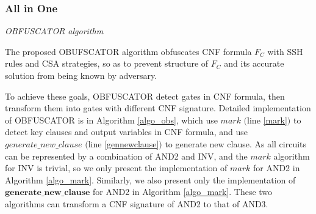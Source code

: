 \documentclass[conference,compsocconf]{IEEEtran}
\begin{document}
\subsubsection{All in One}\textsl{OBFUSCATOR algorithm}

The proposed OBUFSCATOR algorithm obfuscates CNF formula $F_C$ with SSH rules and CSA strategies, 
so as to prevent structure of $F_C$ and its accurate solution from being known by adversary.

To achieve these goals, OBFUSCATOR detect gates in CNF formula, 
then transform them into gates with different CNF signature.
Detailed implementation of OBFUSCATOR is in Algorithm \ref{algo_obs}, which use $mark$ $($line \ref{mark}$)$ to detect key clauses and output variables  in CNF formula, 
and use $generate\_new\_clause$ $($line \ref{gennewclause}$)$ to generate new clause.
As all circuits can be represented by a combination of AND2 and INV, 
and the $mark$ algorithm for INV is trivial, 
so we only present the implementation of $mark$ for AND2 in Algorithm \ref{algo_mark}.
Similarly, we also present only the implementation of $\mathbf{generate\_new\_clause}$ for AND2 in Algorithm \ref{algo_mark}.
These two algorithms can transform a CNF signature of AND2 to that of AND3.
\end{document}
